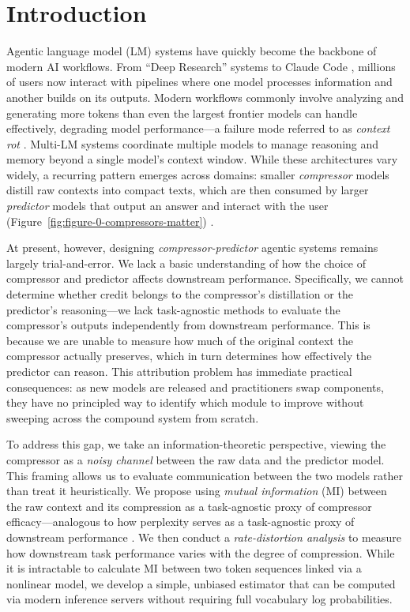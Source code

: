 \documentclass{article} %
\begin{document}
\section{Introduction}\label{introduction}
Agentic language model (LM) systems have quickly become the backbone of modern AI workflows. From ``Deep Research'' systems \citep{hadfield2025multiagent} to 
Claude Code \citep{anthropic2025claude37}, 
millions of users now interact with pipelines where one model processes information and another builds on its outputs. 
Modern workflows commonly involve analyzing and generating more tokens than even the largest frontier models can handle effectively, degrading model performance---a failure mode referred to as \emph{context rot} \citep{hong2025context}. 
Multi-LM systems coordinate multiple models to manage reasoning and memory beyond a single model's context window.
While these architectures vary widely, a recurring pattern emerges across domains: 
smaller \emph{compressor} models distill raw contexts into compact texts, which are then consumed by larger \emph{predictor} models that output an answer and interact with the user (Figure~\ref{fig:figure-0-compressors-matter}) \citep{hadfield2025multiagent, shen2023hugginggptsolvingaitasks}.

At present, however, designing \emph{compressor-predictor} agentic systems remains largely trial-and-error. We lack a basic understanding of how the choice of compressor and predictor affects downstream performance.
Specifically, we cannot determine whether credit belongs to the compressor's distillation or the predictor's reasoning---we lack task-agnostic methods to evaluate the compressor's outputs independently from downstream performance. 
This is because we are unable to measure how much of the original context the compressor actually preserves, which in turn determines how effectively the predictor can reason.
This attribution problem has immediate practical consequences: as new models are released and practitioners swap components, they have no principled way to identify which module to improve without sweeping across the compound system from scratch. 

To address this gap, we take an information-theoretic perspective, viewing the compressor as a \emph{noisy channel} between the raw data and the predictor model.
This framing allows us to evaluate communication between the two models rather than treat it heuristically. 
We propose using \emph{mutual information} (MI) between the raw context and its compression as a task-agnostic proxy of compressor efficacy---analogous to how perplexity serves as a task-agnostic proxy of downstream performance \citep{hoffmann2022empirical, scalinglaws}. We then conduct a \emph{rate-distortion analysis} to measure how downstream task performance varies with the degree of compression. While it is intractable to calculate MI between two token sequences linked via a nonlinear model, we develop a simple, unbiased estimator that can be computed via modern inference servers without requiring full vocabulary log probabilities.
\end{document}
